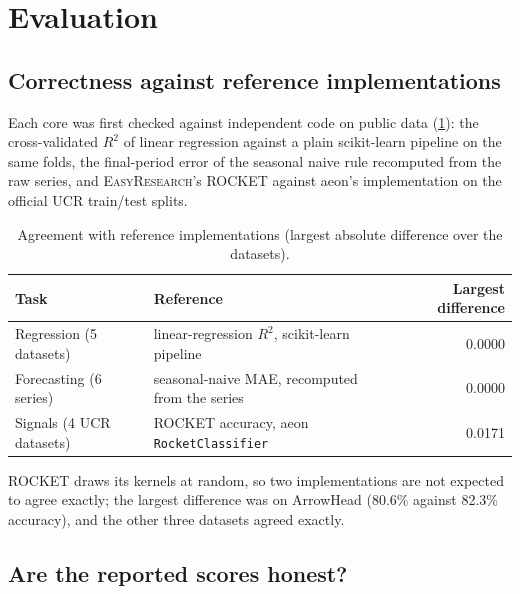 \documentclass[11pt,a4paper]{article}
\newcommand{\ER}{\textsc{EasyResearch}}
\begin{document}
\section{Evaluation}
\label{sec:evaluation}

\subsection{Correctness against reference implementations}
Each core was first checked against independent code on public data (\cref{tab:agreement}): the cross-validated $R^2$ of linear regression against a plain scikit-learn pipeline on the same folds, the final-period error of the seasonal naive rule recomputed from the raw series, and \ER's ROCKET against aeon's implementation on the official UCR train/test splits.

\begin{table}[t]
\centering\small
\caption{Agreement with reference implementations (largest absolute difference over the datasets).}
\label{tab:agreement}
\begin{tabular}{@{}llr@{}}
\toprule
Task & Reference & Largest difference \\
\midrule
Regression (5 datasets) & linear-regression $R^2$, scikit-learn pipeline & 0.0000 \\
Forecasting (6 series) & seasonal-naive MAE, recomputed from the series & 0.0000 \\
Signals (4 UCR datasets) & ROCKET accuracy, aeon \texttt{RocketClassifier} & 0.0171 \\
\bottomrule
\end{tabular}
\end{table}

ROCKET draws its kernels at random, so two implementations are not expected to agree exactly; the largest difference was on ArrowHead (80.6\% against 82.3\% accuracy), and the other three datasets agreed exactly.

\subsection{Are the reported scores honest?}
\end{document}
